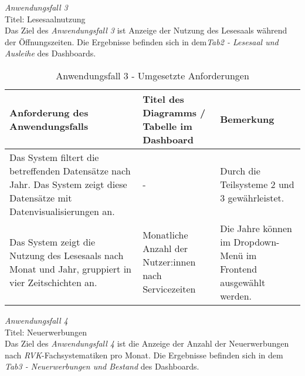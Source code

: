 \noindent
\textit{Anwendungsfall 3}\\
Titel: Lesesaalnutzung\\
Das Ziel des \textit{Anwendungsfall 3} ist Anzeige der Nutzung des Lesesaals während der Öffnungszeiten.
Die Ergebnisse befinden sich in dem\textit{Tab2 - Lesesaal und Ausleihe} des Dashboards.

\begingroup
    \setlength{\tabcolsep}{12pt} %
    \renewcommand{\arraystretch}{1.5} 
    \begin{table}[H]
        \centering
        \begin{adjustbox}{max width=\textwidth}
        \begin{tabular}{p{}p{}p{}}
           \toprule
           Anforderung des Anwendungsfalls        &Titel des Diagramms / Tabelle im Dashboard &Bemerkung\\
           \midrule
           Das System filtert die betreffenden Datensätze nach Jahr. Das System zeigt diese Datensätze mit Datenvisualisierungen an.&-&Durch die Teilsysteme 2  und 3 gewährleistet.\\
           Das System zeigt die Nutzung des Lesesaals nach Monat und Jahr, gruppiert in vier Zeitschichten an.&Monatliche Anzahl der Nutzer:innen nach Servicezeiten& Die Jahre können im Dropdown-Menü im Frontend ausgewählt werden.\\

        \bottomrule
        \end{tabular}
        \end{adjustbox}
        \caption{%
            Anwendungsfall 3 - Umgesetzte Anforderungen
        }
        \label{tab:Anwendungsfall 3 - Umgesetzte Anforderungen}
        \end{table}

\clearpage
\noindent
\textit{Anwendungsfall 4}\\
Titel: Neuerwerbungen\\
Das Ziel des \textit{Anwendungsfall 4} ist die Anzeige der Anzahl der Neuerwerbungen nach \textit{\acrshort{RVK}}-Fachsystematiken pro Monat.
Die Ergebnisse befinden sich in dem \textit{Tab3 - Neuerwerbungen und Bestand} des Dashboards.

